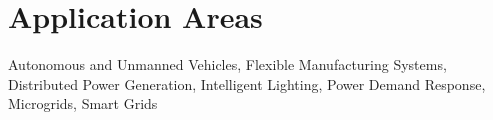\section{Application Areas}

Autonomous and Unmanned Vehicles, Flexible Manufacturing Systems,
Distributed Power Generation, Intelligent Lighting, Power Demand
Response, Microgrids, Smart Grids